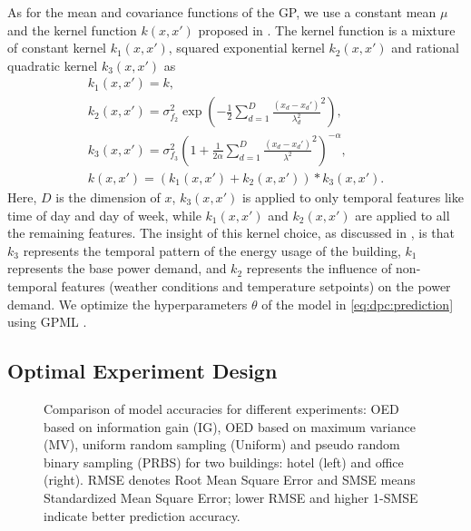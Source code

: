As for the mean and covariance functions of the GP, %
we use a constant mean \(\mu\) and the kernel function \(k(x,x')\) proposed in \cite{nghiemetal16gp}.
The kernel function is a mixture of constant kernel \(k_1(x,x')\), squared exponential kernel \(k_2(x,x')\) and rational quadratic kernel \(k_3(x,x')\) as
\begin{gather}
k_1(x,x')  = k, \nonumber\\
k_2(x,x') = \sigma_{f_2}^2 \exp \left( -\textstyle\frac{1}{2} \textstyle\sum_{d=1}^D \frac{(x_d-x_d')}{{\lambda_d^2}}^2 \right),
 \nonumber\\
 k_3(x,x') = \sigma_{f_3}^2  \left( 1+ \textstyle\frac{1}{2\alpha} \textstyle\sum_{d=1}^D \frac{(x_d-x_d')}{{\lambda^2}}^2 \right)^{-\alpha},  \nonumber\\
k(x,x') = \left(k_1(x,x') + k_2(x,x')\right)*k_3(x,x').
\end{gather}
Here, \(D\) is the dimension of \(x\), \(k_3(x,x')\) is applied to only temporal features like time of day and day of week, while \(k_1(x,x')\) and \(k_2(x,x')\) are applied to all the remaining features.
The insight of this kernel choice, as discussed in \cite{nghiemetal16gp}, is that $k_{3}$ represents the temporal pattern of the energy usage of the building, $k_{1}$ represents the base power demand, and $k_{2}$ represents the influence of non-temporal features (\eg weather conditions and temperature setpoints) on the power demand.
We optimize the hyperparameters \(\theta\) %
of the model in \eqref{eq:dpc:prediction} using GPML \cite{Rasmussen2010}.



\subsection{Optimal Experiment Design}
\label{SS:casestudy:oed}

\begin{figure*}[t]
	\centering
	\setlength{}
	\setlength{}
	
	
	\caption{Comparison of model accuracies for different experiments: OED based on information gain (IG),  OED based on maximum variance (MV), uniform random sampling (Uniform) and pseudo random binary sampling (PRBS) for two buildings: hotel (left) and office (right). RMSE denotes Root Mean Square Error and SMSE means Standardized Mean Square Error; lower RMSE and higher 1-SMSE indicate better prediction accuracy.}
	\captionsetup{justification=centering}
    \vspace{-10pt}
	\label{F:casestudy:oed}
\end{figure*}

